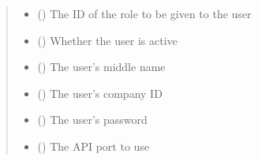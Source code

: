 \documentclass[letterpaper,10pt,english]{sphinxmanual}
\begin{document}
\begin{fulllineitems}
\begin{fulllineitems}
\begin{quote}
\begin{description}
\begin{itemize}
\item {} 
\sphinxAtStartPar
{} () \textendash{} The ID of the role to be given to the user

\item {} 
\sphinxAtStartPar
{} (\sphinxstyleliteralemphasis{\sphinxupquote{ (}}\sphinxstyleliteralemphasis{\sphinxupquote{)}}) \textendash{} Whether the user is active

\item {} 
\sphinxAtStartPar
{} (\sphinxstyleliteralemphasis{\sphinxupquote{ (}}\sphinxstyleliteralemphasis{\sphinxupquote{)}}) \textendash{} The user’s middle name

\item {} 
\sphinxAtStartPar
{} (\sphinxstyleliteralemphasis{\sphinxupquote{ (}}\sphinxstyleliteralemphasis{\sphinxupquote{)}}) \textendash{} The user’s company ID

\item {} 
\sphinxAtStartPar
{} (\sphinxstyleliteralemphasis{\sphinxupquote{ (}}\sphinxstyleliteralemphasis{\sphinxupquote{)}}) \textendash{} The user’s password

\item {} 
\sphinxAtStartPar
{} (\sphinxstyleliteralemphasis{\sphinxupquote{ (}}\sphinxstyleliteralemphasis{\sphinxupquote{)}}) \textendash{} The API port to use

\end{itemize}


\end{description}
\end{quote}
\end{fulllineitems}
\end{fulllineitems}
\end{document}
